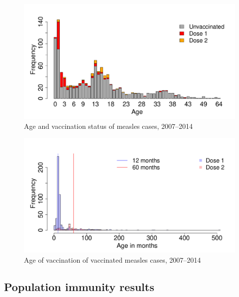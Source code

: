 \documentclass{article}
\begin{document}
\begin{figure}
\begin{center}
\includegraphics{draftfinalreport-020}
\end{center}
\caption{Age and vaccination status of measles cases, 2007--2014}
\label{fig:ageandvac}
\end{figure}

\begin{figure}
\begin{center}
\includegraphics{draftfinalreport-021}
\end{center}
\caption{Age of vaccination of vaccinated measles cases, 2007--2014}
\label{fig:vaccstat}
\end{figure}

\subsection{Population immunity results}
\label{sub:popim}
\end{document}
